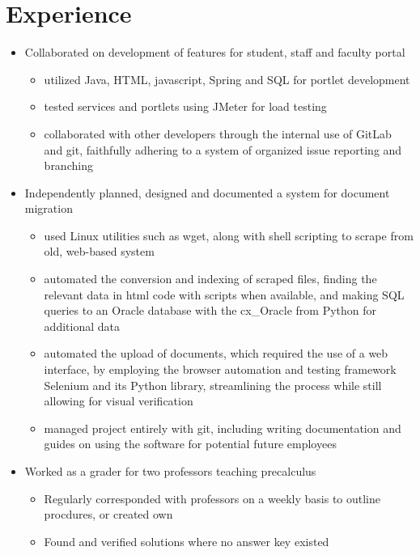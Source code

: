 \documentclass[11pt,a4paper,sans]{moderncv}
\begin{document}
\section{Experience}
%
\begin{itemize}%
\item Collaborated on development of features for student, staff and faculty portal
    \begin{itemize}
    \item utilized Java, HTML, javascript, Spring and SQL for portlet development
    \item tested  services and portlets using JMeter for load testing
    \item collaborated with other developers through the internal use of GitLab 
    and git, faithfully adhering to a system of organized issue reporting and 
    branching
    \end{itemize}
\item Independently planned, designed and documented a system for document migration
    \begin{itemize}%
    \item used Linux utilities such as wget, along with shell scripting to scrape
    from old, web-based system
    \item automated the conversion and indexing of scraped files, finding the 
    relevant data in html code with scripts when available, and making SQL queries
    to an Oracle database with the cx\_Oracle from Python for additional data
    \item automated the upload of documents, which required the use of a web 
    interface, by employing the browser automation and testing framework Selenium 
    and its Python library, streamlining the process while still allowing for 
    visual verification
    \item managed project entirely with git, including writing documentation and 
    guides on using the software for potential future employees
    \end{itemize}
\end{itemize}
\begin{itemize}
\item Worked as a grader for two professors teaching precalculus
    \begin{itemize}
    \item Regularly corresponded with professors on a weekly basis to outline procdures, or created own
    \item Found and verified solutions where no answer key existed
    \end{itemize}
\end{itemize}
\end{document}
